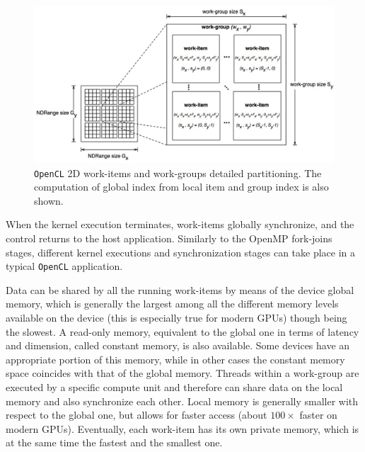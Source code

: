 \begin{description}
        \begin{figure}
    	\centering
    	\includegraphics[width=1.1\textwidth]{./images/parallel_programming/opencl_execmodel2d}
    	\caption[\texttt{OpenCL} 2D work-items and work-groups detailed partitioning]{\texttt{OpenCL} 2D work-items and work-groups detailed partitioning. The computation of global index from local item and group index is also shown.}\label{fig:opencl_execmodel2d}
    \end{figure}
    When the kernel execution terminates,
    work-items globally synchronize, and the control returns to the
    host application. Similarly to the OpenMP fork-joins stages,
    different kernel executions and synchronization stages can take
    place in a typical \texttt{OpenCL} application.
    
    Data can be shared by all the running work-items by means of the
    device global memory, which is generally the largest among all the
    different memory levels available on the device (this is especially true for modern GPUs)
    though being the slowest. A read-only memory, equivalent to the
    global one in terms of latency and dimension, called constant
    memory, is also available. Some devices have an appropriate
    portion of this memory, while in other cases the constant memory
    space coincides with that of the global memory. Threads within a
    work-group are executed by a specific compute unit and therefore
    can share data on the local memory and also synchronize each
    other. Local memory is generally smaller with respect to the
    global one, but allows for faster access (about $100\times$ faster
    on modern GPUs). Eventually, each work-item has its own private
    memory, which is at the same time the fastest and the smallest
    one. 
    

\end{description}

